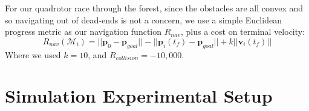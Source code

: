 \documentclass{llncs}
\begin{document}
For our quadrotor race through the forest, since the obstacles are all convex and so navigating out of dead-ends is not a concern, we use a simple Euclidean progress metric as our navigation function $R_{nav}$, plus a cost on terminal velocity:
%
\begin{equation}
R_{nav}(\mathcal{M}_i) = ||\mathbf{p}_0 - \mathbf{p}_{goal}|| - ||\mathbf{p}_i(t_f) - \mathbf{p}_{goal}|| + k || \mathbf{v}_i(t_f)||
\end{equation}
%
Where we used $k=10$, and $R_{collision} = -10,000$.




\section{Simulation Experimental Setup}
\end{document}
